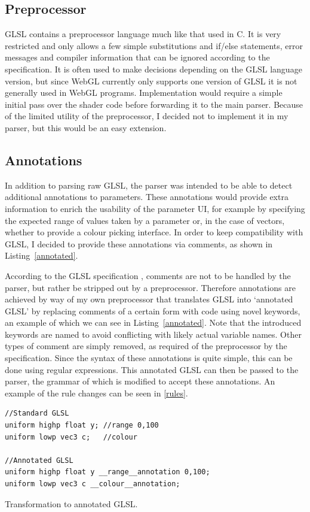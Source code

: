 \documentclass[12pt,twoside,notitlepage]{report}
\begin{document}
\subsection{Preprocessor}
GLSL contains a preprocessor language much like that used in C. It is very restricted and only allows a few simple substitutions and if/else statements, error messages and compiler information that can be ignored according to the specification. It is often used to make decisions depending on the GLSL language version, but since {WebGL} currently only supports one version of GLSL it is not generally used in WebGL programs. Implementation would require a simple initial pass over the shader code before forwarding it to the main parser. Because of the limited utility of the preprocessor, I decided not to implement it in my parser, but this would be an easy extension.

\subsection{Annotations}
\label{annotations}
In addition to parsing raw GLSL, the parser was intended to be able to detect additional annotations to parameters. These annotations would provide extra information to enrich the usability of the parameter UI, for example by specifying the expected range of values taken by a parameter or, in the case of vectors, whether to provide a colour picking interface. In order to keep compatibility with GLSL, I decided to provide these annotations via comments, as shown in Listing~\ref{annotated}. 

According to the GLSL specification \citep{glsl-spec}, comments are not to be handled by the parser, but rather be stripped out by a preprocessor. Therefore annotations are achieved by way of my own preprocessor that translates GLSL into `annotated GLSL' by replacing comments of a certain form with code using novel keywords, an example of which we can see in Listing~\ref{annotated}. Note that the introduced keywords are named to avoid conflicting with likely actual variable names. Other types of comment are simply removed, as required of the preprocessor by the specification. Since the syntax of these annotations is quite simple, this can be done using regular expressions. This annotated GLSL can then be passed to the parser, the grammar of which is modified to accept these annotations. An example of the rule changes can be seen in \ref{rules}.

\begin{listing}
\begin{verbatim}
//Standard GLSL
uniform highp float y; //range 0,100
uniform lowp vec3 c;   //colour

//Annotated GLSL
uniform highp float y __range__annotation 0,100;
uniform lowp vec3 c __colour__annotation;
\end{verbatim}
\caption{Transformation to annotated GLSL.\label{annotated}}
\end{listing}
\end{document}
